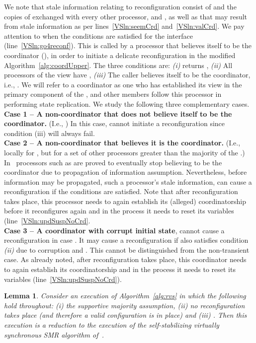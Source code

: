 \documentclass[11pt]{article}
\newtheorem{lemma}[theorem]{Lemma}
\newenvironment{proof}{\noindent{\bf Proof.}}{\hfill}
\begin{document}
\begin{proof}
We note that stale information relating to reconfiguration consist of  and the copies of  exchanged with every other processor, and , as well as  that may result from stale information as per lines~\ref{VSln:seemCrd} and~\ref{VSln:valCrd}. 
We pay attention to when the conditions are satisfied for the  interface (line~\ref{VSln:go4reconf}). 
This is called by a processor that believes itself to be the coordinator (), in order to initiate a delicate reconfiguration in the modified Algorithm~\ref{alg:coordUpper}.
The three conditions are:
\emph{(i)}  returns ,
\emph{(ii)} All processors of the view have ,
\emph{(iii)} The caller believes itself to be the coordinator, i.e., .
We will refer to a coordinator as one who has established its view in the primary component of the , and other  members follow this processor in performing state replication.
We study the following three complementary cases.\\
{\bf Case 1 -- A non-coordinator  that does not believe itself to be the coordinator.} (I.e., ) In this case,  cannot initiate a reconfiguration since condition (iii) will always fail.\\
{\bf Case 2 -- A non-coordinator  that believes it is the coordinator.} (I.e.,  locally for , but  for a set of other processors greater than the majority of the .) In~\cite{SSVS} processors such as  are proved to eventually stop believing to be the coordinator due to propagation of information assumption.
Nevertheless, before information may be propagated, such a processor's stale information, can cause a reconfiguration if the conditions are satisfied. 
Note that after reconfiguration takes place, this processor needs to again establish its (alleged) coordinatorship before it reconfigures again and in the process it needs to reset its  variables (line~\ref{VSln:updSuspNoCrd}.\\
{\bf Case 3 -- A coordinator  with corrupt initial state}, cannot cause a reconfiguration in case . 
It may cause a reconfiguration if also satisfies condition \emph{(ii)} due to corruption and .
This cannot be distinguished from the non-transient case.
As already noted, after reconfiguration takes place, this coordinator needs to again establish its coordinatorship and in the process it needs to reset its  variables (line~\ref{VSln:updSuspNoCrd}).
\end{proof}

\begin{lemma}
\label{thVS:reduction}
Consider an execution  of Algorithm~\ref{alg:rvs} in which the following hold throughout: (i) the supportive majority assumption, (ii) no reconfiguration takes place (and therefore a valid configuration  is in place) and (iii) .
Then this execution is a reduction to the execution of the self-stabilizing virtually synchronous SMR algorithm 
of~\cite{SSVS}.
\end{lemma}
\end{document}
